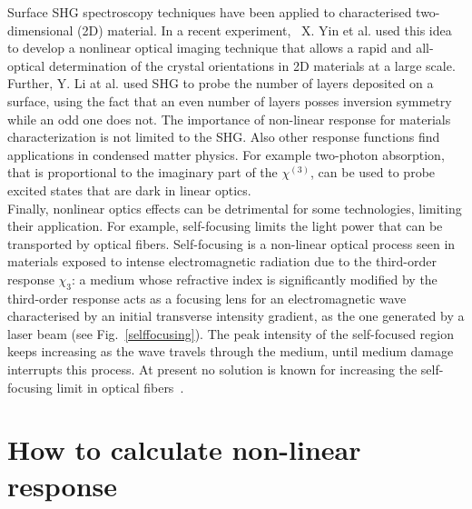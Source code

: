 Surface SHG spectroscopy techniques have been applied to characterised two-dimensional (2D) material. In a recent experiment,~\cite{yin2014edge}  X. Yin et al. used this idea to develop a nonlinear optical imaging technique that allows a rapid and all-optical determination of the crystal orientations in 2D materials at a large scale. %
Further, Y. Li at al. used SHG to probe the number of layers deposited on a surface, using the fact that an even number of layers posses inversion symmetry while an odd one does not.\cite{doi:10.1021/nl401561r} The importance of non-linear response for materials characterization is not limited to the SHG. Also other response functions find applications in condensed matter physics. For example two-photon absorption, that is proportional to the imaginary part of the $\chi^{(3)}$, can be used to probe excited states that are dark in linear optics.\cite{wang2005optical,cassabois2015hexagonal}\\

Finally, nonlinear optics effects can be detrimental for some technologies, limiting their application. For example, self-focusing limits the light power that can be transported by optical fibers. Self-focusing is a non-linear optical process seen in materials exposed to intense electromagnetic radiation due to the third-order response $\chi_3$:  a medium whose refractive index is significantly modified by the third-order response acts as a focusing lens for an electromagnetic wave characterised by an initial transverse intensity gradient, as the one generated by a laser beam (see Fig.~\ref{selffocusing}). The peak intensity of the self-focused region keeps increasing as the wave travels through the medium, until medium damage interrupts this process. At present no solution is known for increasing the self-focusing limit in optical fibers~\cite{encylaser}.

\section{How to calculate non-linear response}
